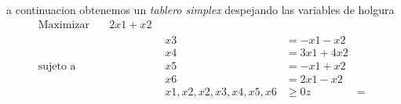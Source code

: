 \documentclass{article}
\begin{document}
a continuacion obtenemos un \emph{tablero simplex} despejando las
variables de holgura
\begin{equation*}
  \begin{aligned}
    \text{Maximizar} \quad & 2x1+x2\\
    
    \text{sujeto a}\quad &
    
    \quad & \begin{aligned}
    x3&=- x1-x2 \\  
    x4&= 3x1+4x2 \\
    x5&=- x1+x2 \\
    x6&=2x1-x2\\
     x1,x2,x2,x3,x4,x5,x6 &\geq 0

     \hline
     z&=
   \end{aligned}
  \end{aligned}
\end{equation*}
\end{document}
